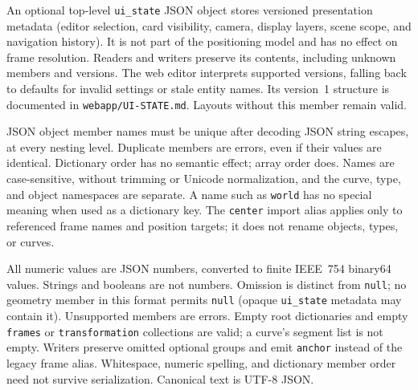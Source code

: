 \documentclass[11pt,a4paper]{article}
\begin{document}
An optional top-level \texttt{ui\_state} JSON object stores versioned
presentation metadata (editor selection, card visibility, camera, display
layers, scene scope, and navigation history). It is not part of the positioning
model and has no effect on frame resolution. Readers and writers preserve its
contents, including unknown members and versions. The web editor interprets
supported versions, falling back to defaults for invalid settings or stale
entity names. Its version~1 structure is documented in
\texttt{webapp/UI-STATE.md}. Layouts without this member remain valid.

JSON object member names must be unique after decoding JSON string escapes,
at every nesting level. Duplicate members are errors, even if their values
are identical. Dictionary order has no semantic effect; array order does.
Names are case-sensitive, without trimming or Unicode normalization, and
the curve, type, and object namespaces are separate. A name such as
\texttt{world} has no special meaning when used as a dictionary key.
The \texttt{center} import alias applies only to referenced frame names and
position targets; it does not rename objects, types, or curves.

All numeric values are JSON numbers, converted to finite IEEE~754 binary64
values. Strings and booleans are not numbers. Omission is distinct from
\texttt{null}; no geometry member in this format permits \texttt{null}
(opaque \texttt{ui\_state} metadata may contain it). Unsupported
members are errors. Empty root dictionaries and empty \texttt{frames} or
\texttt{transformation} collections are valid; a curve's segment list is not
empty. Writers preserve omitted optional groups and emit \texttt{anchor}
instead of the legacy frame alias. Whitespace, numeric spelling, and dictionary
member order need not survive serialization. Canonical text is UTF-8 JSON.
\end{document}
